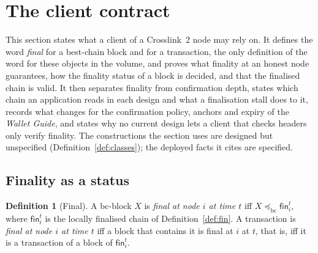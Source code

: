 \documentclass[11pt,a4paper]{article}
\theoremstyle{definition}
\newtheorem{definition}[theorem]{Definition}
\newcommand{\bc}{\mathrm{bc}}
\newcommand{\preceqbc}{\preceq_{\bc}}
\newcommand{\fin}{\mathsf{fin}}
\begin{document}
\section{The client contract}\label{sec:contract}

This section states what a client of a Crosslink~2 node may rely on. It
defines the word \emph{final} for a best-chain block and for a transaction,
the only definition of the word for these objects in the volume, and proves
what finality at an honest node guarantees, how the finality status of a
block is decided, and that the finalised chain is valid. It then separates
finality from confirmation depth, states which chain an application reads in
each design and what a finalisation stall does to it, records what changes
for the confirmation policy, anchors and expiry of the \emph{Wallet Guide},
and states why no current design lets a client that checks headers only
verify finality. The constructions the section uses are designed but
unspecified (Definition~\ref{def:classes}); the deployed facts it cites are
specified.

\subsection{Finality as a status}\label{sec:k-final}

\begin{definition}[Final]\label{def:final}
A bc-block $X$ is \emph{final at node $i$ at time $t$} iff
$X \preceqbc \fin_i^t$, where $\fin_i^t$ is the locally finalised chain of
Definition~\ref{def:fin}. A transaction is \emph{final at node $i$ at time
$t$} iff a block that contains it is final at $i$ at $t$, that is, iff it is
a transaction of a block of $\fin_i^t$.
\end{definition}
\end{document}

